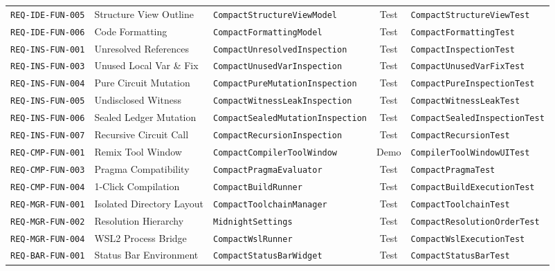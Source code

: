 \begin{table}[htbp]
\begin{tabularx}{\textwidth}{l p{3.2cm} p{3.8cm} c p{3.2cm}}
        \texttt{REQ-IDE-FUN-005} & Structure View Outline & \texttt{CompactStructureViewModel} & Test & \texttt{CompactStructureViewTest} \\
        \texttt{REQ-IDE-FUN-006} & Code Formatting & \texttt{CompactFormattingModel} & Test & \texttt{CompactFormattingTest} \\
        \midrule
        \texttt{REQ-INS-FUN-001} & Unresolved References & \texttt{CompactUnresolvedInspection} & Test & \texttt{CompactInspectionTest} \\
        \texttt{REQ-INS-FUN-003} & Unused Local Var \& Fix & \texttt{CompactUnusedVarInspection} & Test & \texttt{CompactUnusedVarFixTest} \\
        \texttt{REQ-INS-FUN-004} & Pure Circuit Mutation & \texttt{CompactPureMutationInspection} & Test & \texttt{CompactPureInspectionTest} \\
        \texttt{REQ-INS-FUN-005} & Undisclosed Witness & \texttt{CompactWitnessLeakInspection} & Test & \texttt{CompactWitnessLeakTest} \\
        \texttt{REQ-INS-FUN-006} & Sealed Ledger Mutation & \texttt{CompactSealedMutationInspection} & Test & \texttt{CompactSealedInspectionTest} \\
        \texttt{REQ-INS-FUN-007} & Recursive Circuit Call & \texttt{CompactRecursionInspection} & Test & \texttt{CompactRecursionTest} \\
        \midrule
        \texttt{REQ-CMP-FUN-001} & Remix Tool Window & \texttt{CompactCompilerToolWindow} & Demo & \texttt{CompilerToolWindowUITest} \\
        \texttt{REQ-CMP-FUN-003} & Pragma Compatibility & \texttt{CompactPragmaEvaluator} & Test & \texttt{CompactPragmaTest} \\
        \texttt{REQ-CMP-FUN-004} & 1-Click Compilation & \texttt{CompactBuildRunner} & Test & \texttt{CompactBuildExecutionTest} \\
        \midrule
        \texttt{REQ-MGR-FUN-001} & Isolated Directory Layout & \texttt{CompactToolchainManager} & Test & \texttt{CompactToolchainTest} \\
        \texttt{REQ-MGR-FUN-002} & Resolution Hierarchy & \texttt{MidnightSettings} & Test & \texttt{CompactResolutionOrderTest} \\
        \texttt{REQ-MGR-FUN-004} & WSL2 Process Bridge & \texttt{CompactWslRunner} & Test & \texttt{CompactWslExecutionTest} \\
        \midrule
        \texttt{REQ-BAR-FUN-001} & Status Bar Environment & \texttt{CompactStatusBarWidget} & Test & \texttt{CompactStatusBarTest} \\

\end{tabularx}
\end{table}
